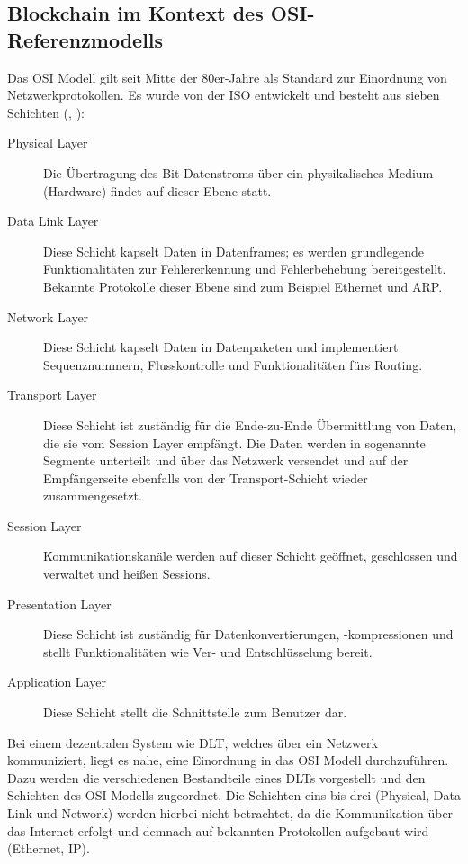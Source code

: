 \subsection{Blockchain im Kontext des OSI-Referenzmodells}
\label{subsec:fundamentals:dlt:osi}
Das \ac{OSI} Modell gilt seit Mitte der 80er-Jahre als Standard zur Einordnung von Netzwerkprotokollen. Es wurde von der \ac{ISO} entwickelt und besteht aus sieben Schichten (\cite{OSI1980}, \cite{osi2014}):
\begin{description}
  \item[Physical Layer] Die Übertragung des Bit-Datenstroms über ein physikalisches Medium (Hardware) findet auf dieser Ebene statt.
  \item[Data Link Layer] Diese Schicht kapselt Daten in Datenframes; es werden grundlegende Funktionalitäten zur Fehlererkennung und Fehlerbehebung bereitgestellt. Bekannte Protokolle dieser Ebene sind zum Beispiel Ethernet und \ac{ARP}.
  \item[Network Layer] Diese Schicht kapselt Daten in Datenpaketen und implementiert Sequenznummern, Flusskontrolle und Funktionalitäten fürs Routing.
  \item[Transport Layer] Diese Schicht ist zuständig für die Ende-zu-Ende Übermittlung von Daten, die sie vom Session Layer empfängt. Die Daten werden in sogenannte Segmente unterteilt und über das Netzwerk versendet und auf der Empfängerseite ebenfalls von der Transport-Schicht wieder zusammengesetzt.
  \item[Session Layer] Kommunikationskanäle werden auf dieser Schicht geöffnet, geschlossen und verwaltet und heißen Sessions.
  \item[Presentation Layer] Diese Schicht ist zuständig für Datenkonvertierungen, -kompressionen und stellt Funktionalitäten wie Ver- und Entschlüsselung bereit.
  \item[Application Layer] Diese Schicht stellt die Schnittstelle zum Benutzer dar.
\end{description}

Bei einem dezentralen System wie \ac{DLT}, welches über ein Netzwerk kommuniziert, liegt es nahe, eine Einordnung in das \ac{OSI} Modell durchzuführen. Dazu werden die verschiedenen Bestandteile eines \ac{DLT}s vorgestellt und den Schichten des \ac{OSI} Modells zugeordnet. Die Schichten eins bis drei (Physical, Data Link und Network) werden hierbei nicht betrachtet, da die Kommunikation über das Internet erfolgt und demnach auf bekannten Protokollen aufgebaut wird (Ethernet, IP).

